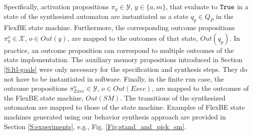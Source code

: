 Specifically, activation propositions $\pi_y \in \mathcal{Y}$, $y \in \{ a, m \}$, that evaluate to $\mathtt{True}$ in a state of the synthesized automaton are instantiated as a state $q_p \in Q_P$ in the FlexBE state machine.
Furthermore, the corresponding outcome propositions $\pi_y^o \in \mathcal{X}$, $o \in Out(y)$, are mapped to the outcomes of that state, $Out(q_p)$.
In practice, an outcome proposition can correspond to multiple outcomes of the state implementation.
The auxiliary memory propositions introduced in Section \ref{S:ltl-goals} were only necessary for the specification and synthesis steps.
They do not have to be instantiated in software.
Finally, in the finite run case, the outcome propositions $\pi_{Exec}^o \in \mathcal{Y}$, $o \in Out(Exec)$, are mapped to the outcomes of the FlexBE state machine, $Out(SM)$.
The transitions of the synthesized automaton are mapped to those of the state machine.
Examples of FlexBE state machines generated using our behavior synthesis approach are provided in Section \ref{S:experiments}, e.g., Fig. \ref{Fig:stand_and_pick_sm}.

